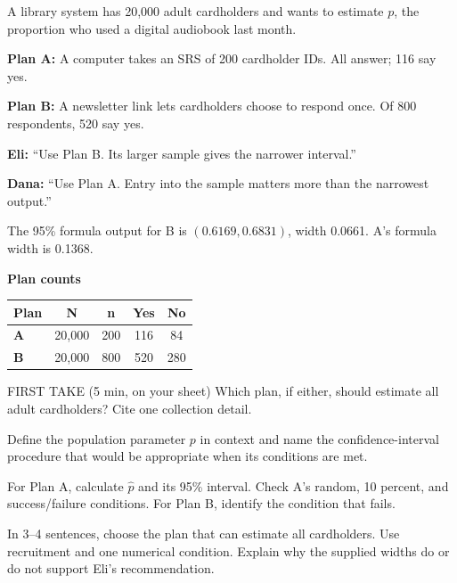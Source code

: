 \documentclass[14pt]{extarticle}
\begin{document}
\pagestyle{empty}


\noindent\begin{minipage}[t]{0.57\linewidth}
\vspace{0pt}
A library system has 20,000 adult cardholders and wants to estimate $p$, the proportion who used a digital audiobook last month.\par\smallskip \textbf{Plan A:} A computer takes an SRS of 200 cardholder IDs. All answer; 116 say yes.\par \textbf{Plan B:} A newsletter link lets cardholders choose to respond once. Of 800 respondents, 520 say yes.\par\smallskip \textbf{Eli:} ``Use Plan B. Its larger sample gives the narrower interval.''\par \textbf{Dana:} ``Use Plan A. Entry into the sample matters more than the narrowest output.''\par\smallskip The 95\% formula output for B is $(0.6169,0.6831)$, width 0.0661. A's formula width is 0.1368.\par
\end{minipage}\hfill
\begin{minipage}[t]{0.40\linewidth}
\vspace{0pt}
\begin{center}
\textbf{Plan counts}\par\smallskip
\begin{tabular}{|l|c|c|c|c|}
\hline
\textbf{Plan} & \textbf{N} & \textbf{n} & \textbf{Yes} & \textbf{No} \\ \hline
\textbf{A} & 20,000 & 200 & 116 & 84 \\ \hline
\textbf{B} & 20,000 & 800 & 520 & 280 \\ \hline
\end{tabular}
\end{center}
\end{minipage}

\begin{firsttakebox}{FIRST TAKE (5 min, on your sheet)}
Which plan, if either, should estimate all adult cardholders? Cite one collection detail.
\end{firsttakebox}

\begin{description}[leftmargin=1.15in, labelwidth=1in, itemsep=2pt, topsep=2pt]
  \item[\dokbadge{1}~(a)] Define the population parameter $p$ in context and name the confidence-interval procedure that would be appropriate when its conditions are met.
  \item[\dokbadge{2}~(b)] For Plan A, calculate $\hat p$ and its 95\% interval. Check A's random, 10 percent, and success/failure conditions. For Plan B, identify the condition that fails.
  \item[\dokbadge{3}~(c)] In 3--4 sentences, choose the plan that can estimate all cardholders. Use recruitment and one numerical condition. Explain why the supplied widths do or do not support Eli's recommendation.
\end{description}
\end{document}
